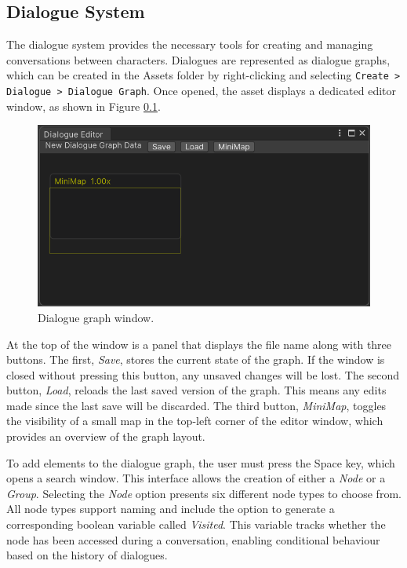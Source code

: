 \subsection{Dialogue System}
The dialogue system provides the necessary tools for creating and managing conversations between characters. Dialogues are represented as dialogue graphs, which can be created in the Assets folder by right-clicking and selecting \verb|Create > Dialogue > Dialogue Graph|. Once opened, the asset displays a dedicated editor window, as shown in Figure \ref{}.

\begin{figure}[H]
\centering
\includegraphics[width=0.8\linewidth]{img/User doc/image_2025-07-04_123651622.png}
\caption{Dialogue graph window.}
\label{fig:Manual-DW}
\end{figure}

At the top of the window is a panel that displays the file name along with three buttons. The first, \textit{Save}, stores the current state of the graph. If the window is closed without pressing this button, any unsaved changes will be lost. The second button, \textit{Load}, reloads the last saved version of the graph. This means any edits made since the last save will be discarded. The third button, \textit{MiniMap}, toggles the visibility of a small map in the top-left corner of the editor window, which provides an overview of the graph layout.

To add elements to the dialogue graph, the user must press the Space key, which opens a search window. This interface allows the creation of either a \textit{Node} or a \textit{Group}. Selecting the \textit{Node} option presents six different node types to choose from. All node types support naming and include the option to generate a corresponding boolean variable called \textit{Visited}. This variable tracks whether the node has been accessed during a conversation, enabling conditional behaviour based on the history of dialogues.

